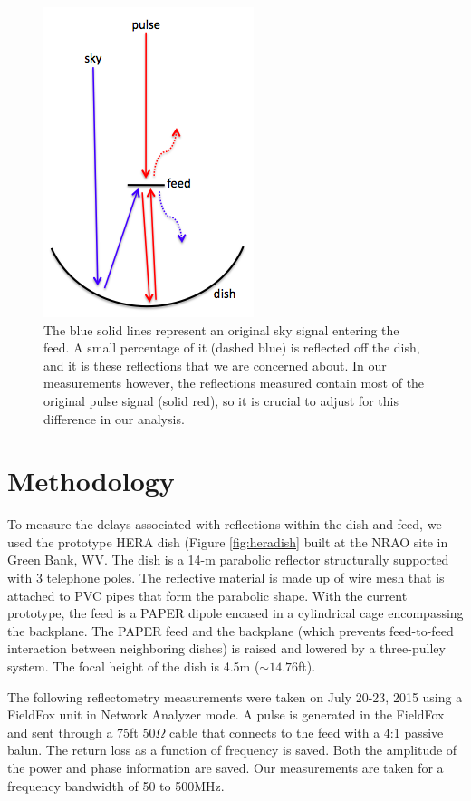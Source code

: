 \documentclass[12pt,preprint]{aastex}
\begin{document}
\begin{figure}
\centering
\includegraphics[totalheight=0.5\textheight]{plots/reflection_cartoon.png}
\caption{The blue solid lines represent an original sky signal entering the feed. A small percentage of it (dashed blue) is reflected off the dish, and it is these reflections that we are concerned about. In our measurements however, the reflections measured contain most of the original pulse signal (solid red), so it is crucial to adjust for this difference in our analysis.}
\end{figure}

\section{Methodology}

To measure the delays associated with reflections within the dish and feed, we
used the prototype HERA dish (Figure \ref{fig:heradish} built at the NRAO site in
Green Bank, WV. The dish is a 14-m parabolic reflector structurally supported
with 3 telephone poles. The reflective material is made up of wire mesh that
is attached to PVC pipes that form the parabolic shape. With the current
prototype, the feed is a PAPER dipole encased in a cylindrical cage encompassing
the backplane. The PAPER feed and the backplane (which prevents feed-to-feed
interaction between neighboring dishes) is raised and lowered by a three-pulley
system. The focal height of the dish is 4.5m ($\sim{14.76}$ft).

The following reflectometry measurements were taken on July 20-23, 2015 using a
FieldFox unit in Network Analyzer mode. A pulse is generated in the FieldFox
and sent through a 75ft $50\Omega$ cable that connects to the feed with a 4:1
passive balun. The return loss as a function of frequency is saved. Both
the amplitude of the power and phase information are saved. Our
measurements are taken for a frequency bandwidth of 50 to 500MHz. 
\end{document}
